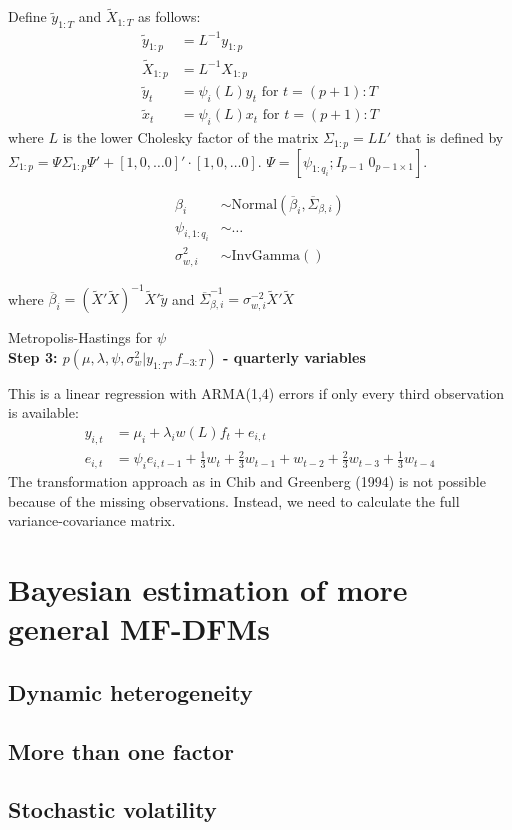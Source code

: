 Define $\tilde{y}_{1:T}$ and $\tilde{X}_{1:T}$ as follows:
\begin{align}
\tilde{y}_{1:p} &= L^{-1}y_{1:p}\\ 
\tilde{X}_{1:p} &= L^{-1}X_{1:p}\\
\tilde{y}_t     &= \psi_i(L) y_t \text{ for } t=(p+1):T\\
\tilde{x}_t     &= \psi_i(L) x_t \text{ for } t=(p+1):T
\end{align}
where $L$ is the lower Cholesky factor of the matrix $\Sigma_{1:p}=LL'$ that is defined by $\Sigma_{1:p} = \Psi \Sigma_{1:p} \Psi' + [1,0, \dots 0]'\cdot[1,0, \dots 0]$. $\Psi = [\psi_{1:q_i}; I_{p-1} \; 0_{p-1\times 1}]$.

\begin{align*}
\beta_i &\sim \mathrm{Normal}(\overline{\beta}_i, \overline{\Sigma}_{\beta,i}) \\
\psi_{i,1:q_i} &\sim \dots \\
\sigma_{w,i}^2 &\sim \mathrm{InvGamma}()
\end{align*}

where $\overline{\beta}_i = (\tilde{X}'\tilde{X})^{-1}\tilde{X}'\tilde{y}$ and $\overline{\Sigma}^{-1}_{\beta,i}= \sigma_{w,i}^{-2} \tilde{X}'\tilde{X}$

Metropolis-Hastings for $\psi$\\

\textbf{Step 3: $p(\mu, \lambda, \psi, \sigma_{w}^2|y_{1:T}, f_{-3:T})$ - quarterly variables}

This is a linear regression with ARMA(1,4) errors if only every third observation is available:
\begin{align}
y_{i,t} &= \mu_i + \lambda_i w(L)f_t + e_{i,t} \\
e_{i,t} &= \psi_i e_{i,t-1} + \frac{1}{3}w_t + \frac{2}{3}w_{t-1} + w_{t-2} + \frac{2}{3}w_{t-3} + \frac{1}{3}w_{t-4}
\end{align}
The transformation approach as in Chib and Greenberg (1994) is not possible because of the missing observations. Instead, we need to calculate the full variance-covariance matrix.



\section{Bayesian estimation of more general MF-DFMs}

\subsection*{Dynamic heterogeneity}

\subsection*{More than one factor}

\subsection*{Stochastic volatility}
